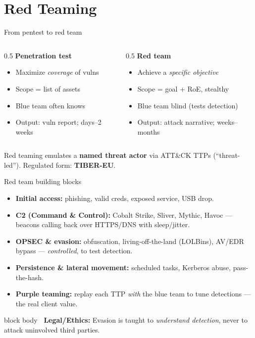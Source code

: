 \documentclass[aspectratio=169,11pt]{beamer}
\newcommand{\legalbox}[1]{%
  \begin{beamercolorbox}[wd=\textwidth,sep=6pt,rounded=true]{block body}%
  \color{warnRed}\textbf{\faExclamationTriangle\ Legal/Ethics:} #1%
  \end{beamercolorbox}}
\begin{document}
\section{Red Teaming}
\begin{frame}{From pentest to red team}
  \begin{columns}[T]
    \begin{column}{0.5\textwidth}
      \textbf{Penetration test}
      \begin{itemize}\footnotesize
        \item Maximize \emph{coverage} of vulns
        \item Scope = list of assets
        \item Blue team often knows
        \item Output: vuln report; days--2 weeks
      \end{itemize}
    \end{column}
    \begin{column}{0.5\textwidth}
      \textbf{Red team}
      \begin{itemize}\footnotesize
        \item Achieve a \emph{specific objective}
        \item Scope = goal + RoE, stealthy
        \item Blue team blind (tests detection)
        \item Output: attack narrative; weeks--months
      \end{itemize}
    \end{column}
  \end{columns}
  \vspace{0.4em}
  Red teaming emulates a \textbf{named threat actor} via ATT\&CK TTPs
  (``threat-led''). Regulated form: \textbf{TIBER-EU}.
\end{frame}

\begin{frame}{Red team building blocks}
  \begin{itemize}
    \item \textbf{Initial access:} phishing, valid creds, exposed service, USB
          drop.
    \item \textbf{C2 (Command \& Control):} Cobalt Strike, Sliver, Mythic, Havoc
          --- beacons calling back over HTTPS/DNS with sleep/jitter.
    \item \textbf{OPSEC \& evasion:} obfuscation, living-off-the-land (LOLBins),
          AV/EDR bypass --- \emph{controlled}, to test detection.
    \item \textbf{Persistence \& lateral movement:} scheduled tasks, Kerberos
          abuse, pass-the-hash.
    \item \textbf{Purple teaming:} replay each TTP \emph{with} the blue team to
          tune detections --- the real client value.
  \end{itemize}
  \legalbox{\footnotesize Evasion is taught to \emph{understand detection}, never
  to attack uninvolved third parties.}
\end{frame}
\end{document}
